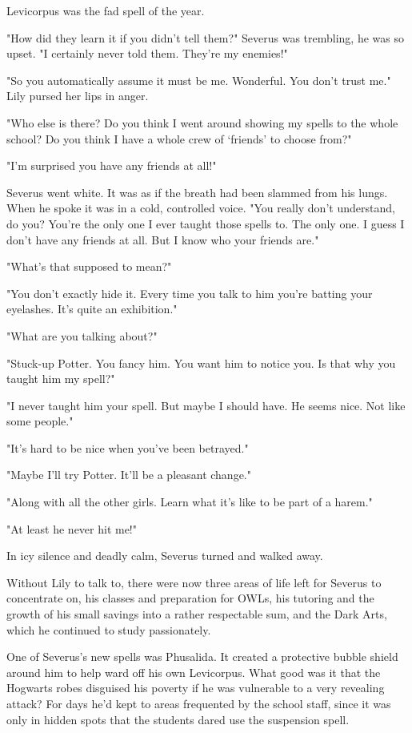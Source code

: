 Levicorpus was the fad spell of the year.

"How did they learn it if you didn't tell them?" Severus was trembling, he was so upset. "I certainly never told them. They're my enemies!"

"So you automatically assume it must be me. Wonderful. You don't trust me." Lily pursed her lips in anger.

"Who else is there? Do you think I went around showing my spells to the whole school? Do you think I have a whole crew of `friends' to choose from?"

"I'm surprised you have any friends at all!"

Severus went white. It was as if the breath had been slammed from his lungs. When he spoke it was in a cold, controlled voice. "You really don't understand, do you? You're the only one I ever taught those spells to. The only one. I guess I don't have any friends at all. But I know who your friends are."

"What's that supposed to mean?"

"You don't exactly hide it. Every time you talk to him you're batting your eyelashes. It's quite an exhibition."

"What are you talking about?"

"Stuck-up Potter. You fancy him. You want him to notice you. Is that why you taught him my spell?"

"I never taught him your spell. But maybe I should have. He seems nice. Not like some people."

"It's hard to be nice when you've been betrayed."

"Maybe I'll try Potter. It'll be a pleasant change."

"Along with all the other girls. Learn what it's like to be part of a harem."

"At least he never hit me!"

In icy silence and deadly calm, Severus turned and walked away.

Without Lily to talk to, there were now three areas of life left for Severus to concentrate on, his classes and preparation for OWLs, his tutoring and the growth of his small savings into a rather respectable sum, and the Dark Arts, which he continued to study passionately.

One of Severus's new spells was Phusalida. It created a protective bubble shield around him to help ward off his own Levicorpus. What good was it that the Hogwarts robes disguised his poverty if he was vulnerable to a very revealing attack? For days he'd kept to areas frequented by the school staff, since it was only in hidden spots that the students dared use the suspension spell.

